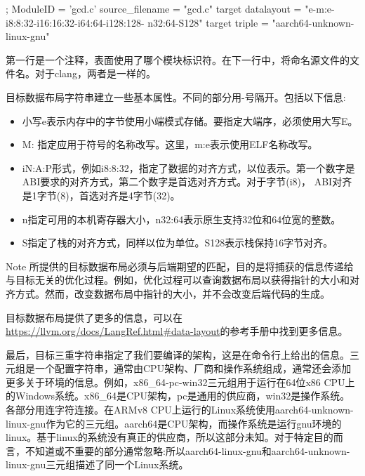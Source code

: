 \begin{shell}
; ModuleID = 'gcd.c'
source_filename = "gcd.c"
target datalayout = "e-m:e-i8:8:32-i16:16:32-i64:64-i128:128-
n32:64-S128"
target triple = "aarch64-unknown-linux-gnu"
\end{shell}

第一行是一个注释，表面使用了哪个模块标识符。在下一行中，将命名源文件的文件名。对于clang，两者是一样的。

目标数据布局字符串建立一些基本属性。不同的部分用-号隔开。包括以下信息:

\begin{itemize}
\item
小写e表示内存中的字节使用小端模式存储。要指定大端序，必须使用大写E。

\item
M: 指定应用于符号的名称改写。这里，m:e表示使用ELF名称改写。

\item
iN:A:P形式，例如i8:8:32，指定了数据的对齐方式，以位表示。第一个数字是ABI要求的对齐方式，第二个数字是首选对齐方式。对于字节(i8)， ABI对齐是1字节(8)，首选对齐是4字节(32)。

\item
n指定可用的本机寄存器大小，n32:64表示原生支持32位和64位宽的整数。

\item
S指定了栈的对齐方式，同样以位为单位。S128表示栈保持16字节对齐。
\end{itemize}

\begin{myNotic}{Note}
所提供的目标数据布局必须与后端期望的匹配，目的是将捕获的信息传递给与目标无关的优化过程。例如，优化过程可以查询数据布局以获得指针的大小和对齐方式。然而，改变数据布局中指针的大小，并不会改变后端代码的生成。

目标数据布局提供了更多的信息，可以在\url{https://llvm.org/docs/LangRef.html#data-layout}的参考手册中找到更多信息。
\end{myNotic}

最后，目标三重字符串指定了我们要编译的架构，这是在命令行上给出的信息。三元组是一个配置字符串，通常由CPU架构、厂商和操作系统组成，通常还会添加更多关于环境的信息。例如，x86\_64-pc-win32三元组用于运行在64位x86 CPU上的Windows系统。x86\_64是CPU架构，pc是通用的供应商，win32是操作系统。各部分用连字符连接。在ARMv8 CPU上运行的Linux系统使用aarch64-unknown-linux-gnu作为它的三元组。aarch64是CPU架构，而操作系统是运行gnu环境的linux。基于linux的系统没有真正的供应商，所以这部分未知。对于特定目的而言，不知道或不重要的部分通常忽略:所以aarch64-linux-gnu和aarch64-unknown-linux-gnu三元组描述了同一个Linux系统。

